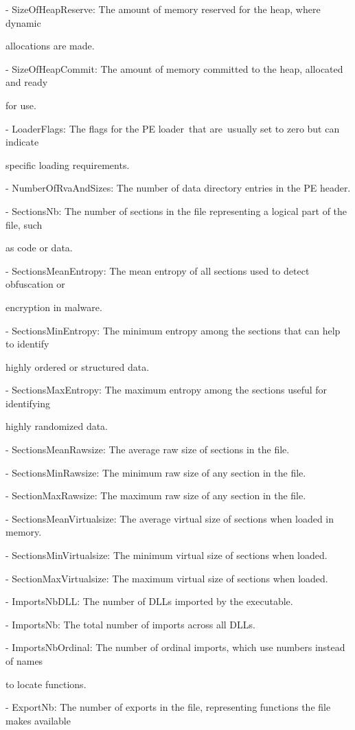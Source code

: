 \begin{multicols}{2}
- SizeOfHeapReserve: The amount of memory reserved for the heap, where
dynamic

allocations are made.

- SizeOfHeapCommit: The amount of memory committed to the heap,
allocated and ready

for use.

- LoaderFlags: The flags for the PE loader~that are~usually set to zero
but can indicate

specific loading requirements.

- NumberOfRvaAndSizes: The number of data directory entries in the PE
header.

- SectionsNb: The number of sections in the file representing a logical
part of the file, such

as code or data.

- SectionsMeanEntropy: The mean entropy of all sections used to detect
obfuscation or

encryption in malware.

- SectionsMinEntropy: The minimum entropy among the sections that can
help to identify

highly ordered or structured data.

- SectionsMaxEntropy: The maximum entropy among the sections useful for
identifying

highly randomized data.

- SectionsMeanRawsize: The average raw size of sections in the file.

- SectionsMinRawsize: The minimum raw size of any section in the file.

- SectionMaxRawsize: The maximum raw size of any section in the file.

- SectionsMeanVirtualsize: The average virtual size of sections when
loaded in memory.

- SectionsMinVirtualsize: The minimum virtual size of sections when
loaded.

- SectionMaxVirtualsize: The maximum virtual size of sections when
loaded.

- ImportsNbDLL: The number of DLLs imported by the executable.

- ImportsNb: The total number of imports across all DLLs.

- ImportsNbOrdinal: The number of ordinal imports, which use numbers
instead of names

to locate functions.

- ExportNb: The number of exports in the file, representing functions
the file makes available


\end{multicols}
